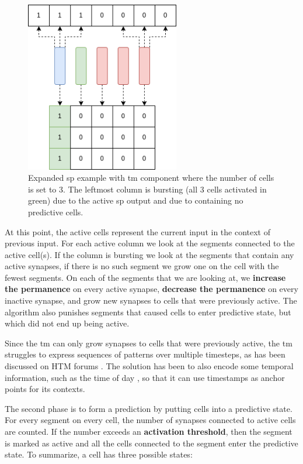 \par
\begin{figure}[H]
    \centering
    \includegraphics[width=0.6\textwidth]{resources/related_works/tm_vis1.png}
    \caption{Expanded \gls*{sp} example with \gls*{tm} component where the number of cells is set to 3. The leftmost column is bursting (all 3 cells activated in green) due to the active \gls*{sp} output and due to containing no predictive cells.}
    \label{fig:tm_vis1}
\end{figure}
At this point, the active cells represent the current input in the context of previous input. For each active column we look at the segments connected to the active cell(s). If the column is bursting we look at the segments that contain any active synapses, if there is no such segment we grow one on the cell with the fewest segments. On each of the segments that we are looking at, we \textbf{increase the permanence} on every active synapse, \textbf{decrease the permanence} on every inactive synapse, and grow new synapses to cells that were previously active. The algorithm also punishes segments that caused cells to enter predictive state, but which did not end up being active.
\par
Since the \gls*{tm} can only grow synapses to cells that were previously active, the \gls*{tm} struggles to express sequences of patterns over multiple timesteps, as has been discussed on HTM forums \cite{tm_sequence_problem}. The solution has been to also encode some temporal information, such as the time of day \cite{AHMAD2017134,tm_sequence_problem}, so that it can use timestamps as anchor points for its contexts.
\par
The second phase is to form a prediction by putting cells into a predictive state. For every segment on every cell, the number of synapses connected to active cells are counted. If the number exceeds an \textbf{activation threshold}, then the segment is marked as active and all the cells connected to the segment enter the predictive state. To summarize, a cell has three possible states:
